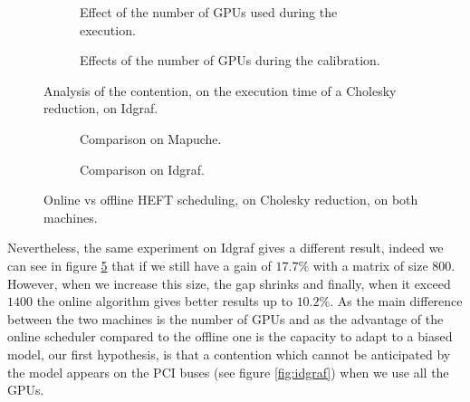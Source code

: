 \documentclass[10pt, conference, compsocconf,pdftex,dvipsnames]{IEEEtran}
\begin{document}
\begin{figure}[htb]
    \addtocounter{figure}{1}
    \centering
    \begin{subfigure}{0.5\textwidth}
        \scalebox{0.6}{
            
        }
        \caption{Effect of the number of GPUs used during the execution.}
        \label{fig:ContentionGpu}
    \end{subfigure}
    \begin{subfigure}{0.5\textwidth}
        \scalebox{0.6}{
            \centering
            
        }
        \caption{Effects of the number of GPUs during the calibration.}
        \label{fig:ContentionTrick}
    \end{subfigure}
    \label{fig:Contention}
    \caption{Analysis of the contention, on the execution time of a 
    Cholesky reduction, on Idgraf.}

\end{figure}

\begin{figure}[bt]
    \addtocounter{figure}{-2}
    \centering
    \begin{subfigure}{0.4\textwidth}
        \hspace{-20pt}
        \scalebox{0.7}{
            
        }
        \caption{Comparison on Mapuche.}
        \label{fig:OnOffMapuche}
    \end{subfigure}
    \hspace{15pt}
    \begin{subfigure}{0.55\textwidth}
        \scalebox{0.7}{
            
        }
        \caption{Comparison on Idgraf.}
        \label{fig:OnOffIdgraf}
    \end{subfigure}
    \caption{Online vs offline HEFT scheduling, on Cholesky reduction, on both
    machines.}
    \label{fig:OnOff}
\end{figure}
\addtocounter{figure}{1}


Nevertheless, the same experiment on Idgraf gives a different result, indeed
we can see in figure \ref{fig:OnOffIdgraf} that if we still have a gain of
$17.7\%$ with a matrix of size $800$. However, when we increase this size, the
gap shrinks and finally, when it exceed $1400$ the online algorithm gives
better results up to $10.2\%$. As the main difference between the two machines
is the number of GPUs and as the advantage of the online scheduler compared to
the offline one is the capacity to adapt to a biased model, our first
hypothesis, is that a contention which cannot be anticipated by the model
appears on the PCI buses (see figure \ref{fig:idgraf}) when we use all the
GPUs. 
\end{document}
